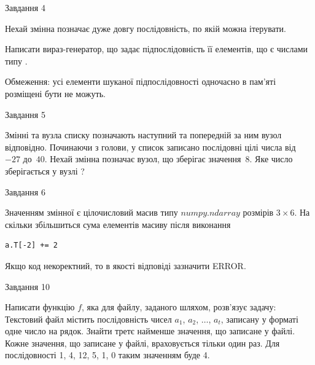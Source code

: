\documentclass[12pt, ukrainian]{article}
\begin{document}
{               
{\begin{center}Завдання {4}\end{center}}
\vspace{-4mm}
Нехай змінна  позначає дуже довгу послідовність, по якій можна ітерувати.

Написати вираз-генератор, що задає підпослідовність її елементів, що є числами типу .

Обмеження: усі елементи шуканої підпослідовності одночасно в пам'яті розміщені бути не можуть.\par

\vspace{10mm}
               
{\begin{center}Завдання {5}\end{center}}
\vspace{-4mm}
Змінні  та  вузла списку позначають наступний та попередній за ним вузол відповідно. Починаючи з голови, у список записано послідовні цілі числа від~$-27$ до~$40$. Нехай змінна  позначає вузол, що зберігає значення~$8$.
Яке число зберігається у вузлі  ?\par

               
{\begin{center}Завдання {6}\end{center}}
\vspace{-4mm}
Значенням змінної  є цілочисловий масив типу $numpy.ndarray$ розмірів $3{\times}6$. На скільки збільшиться сума елементів масиву  після виконання
\begin{verbatim}
a.T[-2] += 2
\end{verbatim}


Якщо код некоректний, то в якості відповіді зазначити ERROR.\par

               
{\begin{center}Завдання {10}\end{center}}
\vspace{-4mm}

Написати функцію $f$, яка для файлу, заданого шляхом, розв’язує задачу:\\ Текстовий файл містить послідовність чисел $a_1$, $a_2$, $\ldots$, $a_t$, записану у форматі одне число на рядок. Знайти третє найменше значення, що записане у файлі. Кожне значення, що записане у файлі, враховується тільки один раз. Для послідовності 1, 4, 12, 5, 1, 0 таким значенням буде 4.

}
\end{document}
